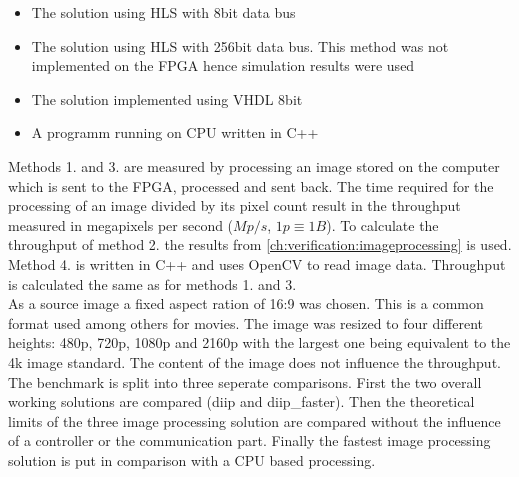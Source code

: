 \begin{itemize}
    \item The solution using HLS with 8bit data bus
    \item The solution using HLS with 256bit data bus. This method was not
    implemented on the FPGA hence simulation results were used
    \item The solution implemented using VHDL 8bit
    \item A programm running on CPU written in C++
\end{itemize}

Methods 1. and 3. are measured by processing an image stored on the computer
which is sent to the FPGA, processed and sent back. The time required for the
processing of an image divided by its pixel count result in the throughput
measured in megapixels per second ($Mp/s$, $1p\equiv1B$). To calculate the
throughput of
method 2. the results from \ref{ch:verification:imageprocessing} is used. Method
4. is written in C++ and uses OpenCV to read image data. Throughput is
calculated the same as for methods 1. and 3.
\\

As a source image a fixed aspect ration of 16:9 was chosen. This is a common
format used among others for movies. The image was resized to four different
heights: 480p, 720p, 1080p and 2160p with the largest one being equivalent to
the
4k image standard. The content of the image does not influence the throughput.
\\

The benchmark is split into three seperate comparisons. First the two overall
working solutions are compared (diip and diip\_faster). Then the theoretical
limits of the three image processing solution are compared without the influence
of a controller or the communication part. Finally the fastest image processing
solution is put in comparison with a CPU based processing.

